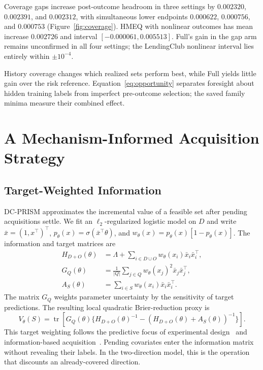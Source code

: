 \documentclass[runningheads]{llncs}
\begin{document}
Coverage gaps increase post-outcome headroom in three settings by $0.002320$, $0.002391$, and $0.002312$, with simultaneous lower endpoints $0.000622$, $0.000756$, and $0.000753$ (Figure~\ref{fig:coverage}). HMEQ with nonlinear outcomes has mean increase $0.002726$ and interval $[-0.000061,0.005513]$. Full's gain in the gap arm remains unconfirmed in all four settings; the LendingClub nonlinear interval lies entirely within $\pm10^{-4}$.

History coverage changes which realized sets perform best, while Full yields little gain over the risk reference. Equation~\eqref{eq:opportunity} separates foresight about hidden training labels from imperfect pre-outcome selection; the saved family minima measure their combined effect.

\section{A Mechanism-Informed Acquisition Strategy}
\label{sec:policy}

\subsection{Target-Weighted Information}
DC-PRISM approximates the incremental value of a feasible set after pending acquisitions settle. We fit an $\ell_2$-regularized logistic model on $D$ and write $\bar x=(1,x^\top)^\top$, $p_\theta(x)=\sigma(\bar x^\top\theta)$, and $w_\theta(x)=p_\theta(x)[1-p_\theta(x)]$. The information and target matrices are
\begin{align}
 H_{D+O}(\theta)&=\Lambda+\sum_{i\in D\cup O}w_\theta(x_i)\bar x_i\bar x_i^\top,\\
 G_Q(\theta)&=\frac1{|Q|}\sum_{j\in Q}w_\theta(x_j)^2\bar x_j\bar x_j^\top,\\
 A_S(\theta)&=\sum_{i\in S}w_\theta(x_i)\bar x_i\bar x_i^\top.
\end{align}
The matrix $G_Q$ weights parameter uncertainty by the sensitivity of target predictions. The resulting local quadratic Brier-reduction proxy is
\begin{equation}
 V_\theta(S)=\operatorname{tr}\!\left[
 G_Q(\theta)\{H_{D+O}(\theta)^{-1}
       -(H_{D+O}(\theta)+A_S(\theta))^{-1}\}\right].\label{eq:value}
\end{equation}
This target weighting follows the predictive focus of experimental design~\cite{yu2006transductive} and information-based acquisition~\cite{ash2021fishing,bickfordsmith2023prediction}. Pending covariates enter the information matrix without revealing their labels. In the two-direction model, this is the operation that discounts an already-covered direction.
\end{document}
